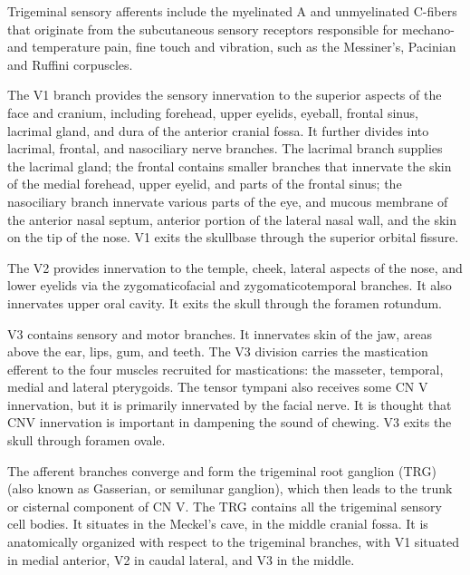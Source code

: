 Trigeminal sensory afferents include the myelinated A and unmyelinated C-fibers that originate from the subcutaneous sensory receptors responsible for mechano- and temperature pain, fine touch and vibration, such as the Messiner's, Pacinian and Ruffini corpuscles. 

The V1 branch provides the sensory innervation to the superior aspects of the face and cranium, including forehead, upper eyelids, eyeball, frontal sinus, lacrimal gland, and dura of the anterior cranial fossa. It further divides into lacrimal, frontal, and nasociliary nerve branches. The lacrimal branch supplies the lacrimal gland; the frontal contains smaller branches that innervate the skin of the medial forehead, upper eyelid, and parts of the frontal sinus; the nasociliary branch innervate various parts of the eye, and mucous membrane of the anterior nasal septum, anterior portion of the lateral nasal wall, and the skin on the tip of the nose. V1 exits the skullbase through the superior orbital fissure.  

The V2 provides innervation to the temple, cheek, lateral aspects of the nose, and lower eyelids via the zygomaticofacial and zygomaticotemporal branches. It also innervates upper oral cavity. It exits the skull through the foramen rotundum. 

V3 contains sensory and motor branches. It innervates skin of the jaw, areas above the ear, lips, gum, and teeth. The V3 division carries the mastication efferent to the four muscles recruited for mastications: the masseter, temporal, medial and lateral pterygoids. The tensor tympani also receives some CN V innervation, but it is primarily innervated by the facial nerve.  It is thought that CNV innervation is important in dampening the sound of chewing. V3 exits the skull through foramen ovale. 

The afferent branches converge and form the trigeminal root ganglion (TRG) (also known as Gasserian, or semilunar ganglion), which then leads to the trunk or cisternal component of CN V. The TRG contains all the trigeminal sensory cell bodies. It situates in the Meckel's cave, in the middle cranial fossa. It is anatomically organized with respect to the trigeminal branches, with V1 situated in medial anterior, V2 in caudal lateral, and V3 in the middle.

